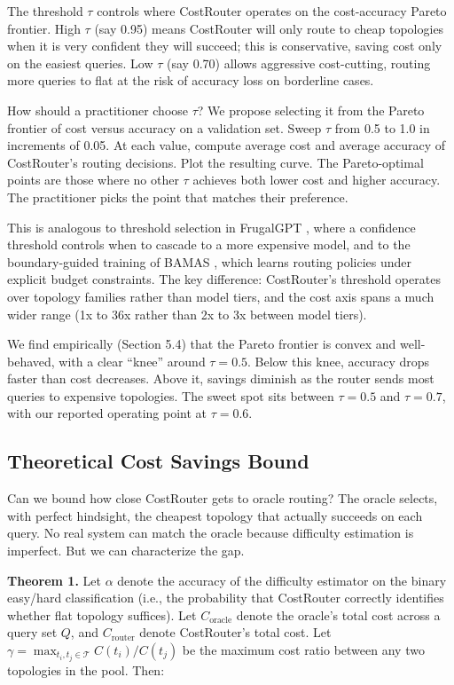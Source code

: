 The threshold $\tau$ controls where CostRouter operates on the cost-accuracy Pareto frontier. High $\tau$ (say 0.95) means CostRouter will only route to cheap topologies when it is very confident they will succeed; this is conservative, saving cost only on the easiest queries. Low $\tau$ (say 0.70) allows aggressive cost-cutting, routing more queries to flat at the risk of accuracy loss on borderline cases.

How should a practitioner choose $\tau$? We propose selecting it from the Pareto frontier of cost versus accuracy on a validation set. Sweep $\tau$ from 0.5 to 1.0 in increments of 0.05. At each value, compute average cost and average accuracy of CostRouter's routing decisions. Plot the resulting curve. The Pareto-optimal points are those where no other $\tau$ achieves both lower cost and higher accuracy. The practitioner picks the point that matches their preference.

This is analogous to threshold selection in FrugalGPT \cite{chen_2023}, where a confidence threshold controls when to cascade to a more expensive model, and to the boundary-guided training of BAMAS \cite{zhang_2026}, which learns routing policies under explicit budget constraints. The key difference: CostRouter's threshold operates over topology families rather than model tiers, and the cost axis spans a much wider range (1x to 36x rather than 2x to 3x between model tiers).

We find empirically (Section 5.4) that the Pareto frontier is convex and well-behaved, with a clear ``knee'' around $\tau = 0.5$. Below this knee, accuracy drops faster than cost decreases. Above it, savings diminish as the router sends most queries to expensive topologies. The sweet spot sits between $\tau = 0.5$ and $\tau = 0.7$, with our reported operating point at $\tau = 0.6$.

\subsection{Theoretical Cost Savings Bound}\label{theoretical-cost-savings-bound}

Can we bound how close CostRouter gets to oracle routing? The oracle selects, with perfect hindsight, the cheapest topology that actually succeeds on each query. No real system can match the oracle because difficulty estimation is imperfect. But we can characterize the gap.

\textbf{Theorem 1.} Let $\alpha$ denote the accuracy of the difficulty estimator on the binary easy/hard classification (i.e., the probability that CostRouter correctly identifies whether flat topology suffices). Let $C_{\text{oracle}}$ denote the oracle's total cost across a query set $Q$, and $C_{\text{router}}$ denote CostRouter's total cost. Let $\gamma = \max_{t_i, t_j \in \mathcal{T}} C(t_i) / C(t_j)$ be the maximum cost ratio between any two topologies in the pool. Then:

